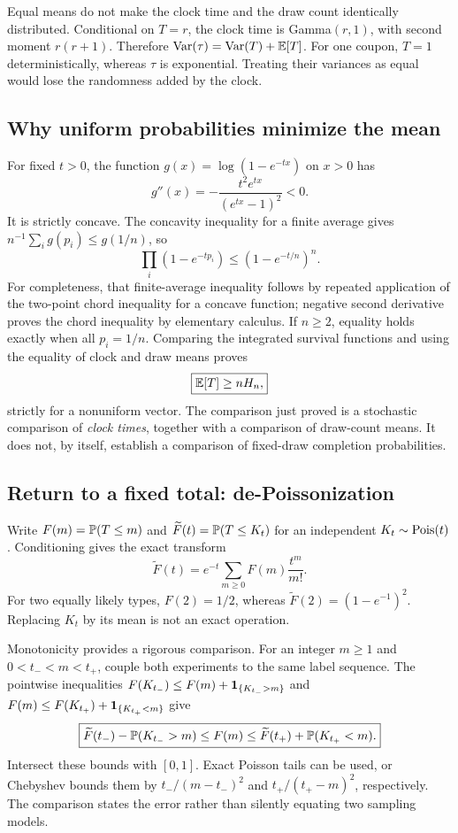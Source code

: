 \begin{warningbox}
Equal means do not make the clock time and the draw count identically
distributed. Conditional on $T=r$, the clock time is Gamma$(r,1)$,
with second moment $r(r+1)$. Therefore
$\Var(\tau)=\Var(T)+\E[T]$. For one coupon, $T=1$ deterministically,
whereas $\tau$ is exponential. Treating their variances as equal would
lose the randomness added by the clock.
\end{warningbox}

\subsection{Why uniform probabilities minimize the mean}

For fixed $t>0$, the function $g(x)=\log(1-e^{-tx})$ on $x>0$ has
\[
g''(x)=-\frac{t^2e^{tx}}{(e^{tx}-1)^2}<0.
\]
It is strictly concave. The concavity inequality for a finite average
gives $n^{-1}\sum_i g(p_i)\le g(1/n)$, so
\[
\prod_i(1-e^{-tp_i})\le(1-e^{-t/n})^n.
\]
For completeness, that finite-average inequality follows by repeated
application of the two-point chord inequality for a concave function;
negative second derivative proves the chord inequality by elementary
calculus. If $n\ge2$, equality holds exactly when all $p_i=1/n$.
Comparing the integrated survival functions and using the equality of
clock and draw means proves
\[
\boxed{\E[T]\ge nH_n,}
\]
strictly for a nonuniform vector. The comparison just proved is a
stochastic comparison of \emph{clock times}, together with a comparison
of draw-count means. It does not, by itself, establish a comparison of
fixed-draw completion probabilities.

\subsection{Return to a fixed total: de-Poissonization}
\label{sec:depoissonization}

Write $F(m)=\P(T\le m)$ and $\widetilde F(t)=\P(T\le K_t)$ for an
independent $K_t\sim\Pois(t)$. Conditioning gives the exact transform
\[
\widetilde F(t)=e^{-t}\sum_{m\ge0}F(m)\frac{t^m}{m!}.
\]
For two equally likely types, $F(2)=1/2$, whereas
$\widetilde F(2)=(1-e^{-1})^2$. Replacing $K_t$ by its mean is not an
exact operation.

Monotonicity provides a rigorous comparison. For an integer $m\ge1$
and $0<t_-<m<t_+$, couple both experiments to the same label sequence.
The pointwise inequalities
$F(K_{t_-})\le F(m)+\ind_{\{K_{t_-}>m\}}$ and
$F(m)\le F(K_{t_+})+\ind_{\{K_{t_+}<m\}}$ give
\[
\boxed{\widetilde F(t_-)-\P(K_{t_-}>m)
\le F(m)\le
\widetilde F(t_+)+\P(K_{t_+}<m).}
\]
Intersect these bounds with $[0,1]$. Exact Poisson tails can be used,
or Chebyshev bounds them by $t_-/(m-t_-)^2$ and
$t_+/(t_+-m)^2$, respectively. The comparison states the error rather
than silently equating two sampling models.

